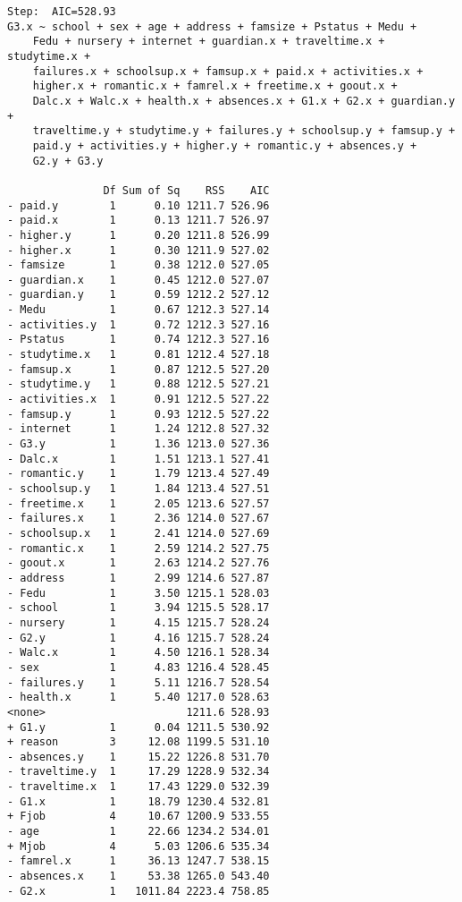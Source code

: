 \documentclass[11pt]{article}
\begin{document}
\begin{enumerate}
\begin{verbatim}
Step:  AIC=528.93
G3.x ~ school + sex + age + address + famsize + Pstatus + Medu + 
    Fedu + nursery + internet + guardian.x + traveltime.x + studytime.x + 
    failures.x + schoolsup.x + famsup.x + paid.x + activities.x + 
    higher.x + romantic.x + famrel.x + freetime.x + goout.x + 
    Dalc.x + Walc.x + health.x + absences.x + G1.x + G2.x + guardian.y + 
    traveltime.y + studytime.y + failures.y + schoolsup.y + famsup.y + 
    paid.y + activities.y + higher.y + romantic.y + absences.y + 
    G2.y + G3.y

               Df Sum of Sq    RSS    AIC
- paid.y        1      0.10 1211.7 526.96
- paid.x        1      0.13 1211.7 526.97
- higher.y      1      0.20 1211.8 526.99
- higher.x      1      0.30 1211.9 527.02
- famsize       1      0.38 1212.0 527.05
- guardian.x    1      0.45 1212.0 527.07
- guardian.y    1      0.59 1212.2 527.12
- Medu          1      0.67 1212.3 527.14
- activities.y  1      0.72 1212.3 527.16
- Pstatus       1      0.74 1212.3 527.16
- studytime.x   1      0.81 1212.4 527.18
- famsup.x      1      0.87 1212.5 527.20
- studytime.y   1      0.88 1212.5 527.21
- activities.x  1      0.91 1212.5 527.22
- famsup.y      1      0.93 1212.5 527.22
- internet      1      1.24 1212.8 527.32
- G3.y          1      1.36 1213.0 527.36
- Dalc.x        1      1.51 1213.1 527.41
- romantic.y    1      1.79 1213.4 527.49
- schoolsup.y   1      1.84 1213.4 527.51
- freetime.x    1      2.05 1213.6 527.57
- failures.x    1      2.36 1214.0 527.67
- schoolsup.x   1      2.41 1214.0 527.69
- romantic.x    1      2.59 1214.2 527.75
- goout.x       1      2.63 1214.2 527.76
- address       1      2.99 1214.6 527.87
- Fedu          1      3.50 1215.1 528.03
- school        1      3.94 1215.5 528.17
- nursery       1      4.15 1215.7 528.24
- G2.y          1      4.16 1215.7 528.24
- Walc.x        1      4.50 1216.1 528.34
- sex           1      4.83 1216.4 528.45
- failures.y    1      5.11 1216.7 528.54
- health.x      1      5.40 1217.0 528.63
<none>                      1211.6 528.93
+ G1.y          1      0.04 1211.5 530.92
+ reason        3     12.08 1199.5 531.10
- absences.y    1     15.22 1226.8 531.70
- traveltime.y  1     17.29 1228.9 532.34
- traveltime.x  1     17.43 1229.0 532.39
- G1.x          1     18.79 1230.4 532.81
+ Fjob          4     10.67 1200.9 533.55
- age           1     22.66 1234.2 534.01
+ Mjob          4      5.03 1206.6 535.34
- famrel.x      1     36.13 1247.7 538.15
- absences.x    1     53.38 1265.0 543.40
- G2.x          1   1011.84 2223.4 758.85


\end{verbatim}
\end{enumerate}
\end{document}
